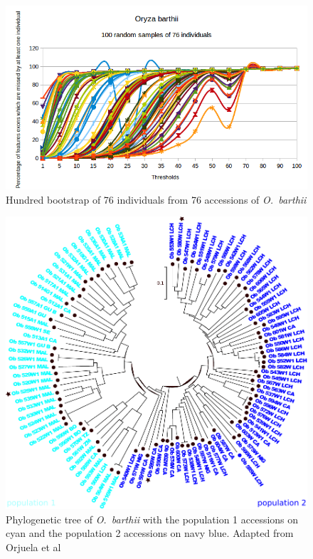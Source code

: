 \documentclass[10pt,letterpaper]{article}
\begin{document}
\begin{figure}
\centering
 \includegraphics[scale=0.7]{determinationSeuilsBootstrapBarExF.png}
 \caption{Hundred bootstrap of 76 individuals from 76 accessions of \emph{O.~barthii}}
 \label{BootstrapOB}
\end{figure}

\begin{figure}
\centering
 \includegraphics[scale=0.7]{arbreBarthiiAvecRef_souspops.pdf}
 \caption{Phylogenetic tree of \emph{O.~barthii} with the population 1 accessions on cyan and the population 2 accessions on navy blue. Adapted from Orjuela et al \cite{Orjuela2014}}
 \label{SSpopOB}
\end{figure}
\end{document}
